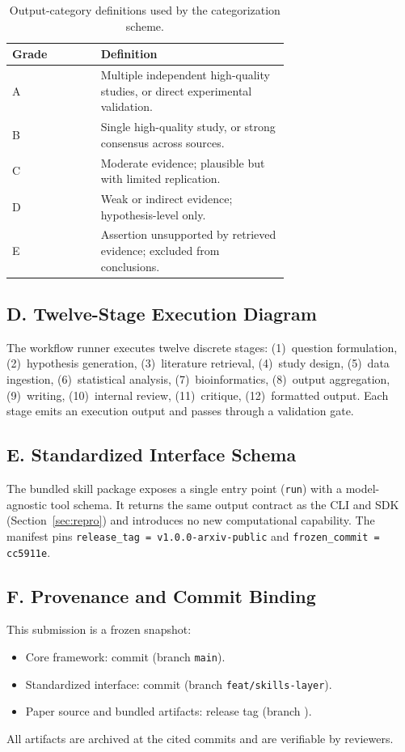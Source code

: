 \begin{table}[h]
\centering
\caption{Output-category definitions used by the categorization scheme.}
\label{tab:evidence}
\begin{tabular}{lp{0.68\linewidth}}
\toprule
Grade & Definition \\
\midrule
A & Multiple independent high-quality studies, or direct experimental validation. \\
B & Single high-quality study, or strong consensus across sources. \\
C & Moderate evidence; plausible but with limited replication. \\
D & Weak or indirect evidence; hypothesis-level only. \\
E & Assertion unsupported by retrieved evidence; excluded from conclusions. \\
\bottomrule
\end{tabular}
\end{table}

\subsection{D. Twelve-Stage Execution Diagram}
The workflow runner executes twelve discrete stages: (1)~question formulation,
(2)~hypothesis generation, (3)~literature retrieval, (4)~study design,
(5)~data ingestion, (6)~statistical analysis, (7)~bioinformatics,
(8)~output aggregation, (9)~writing, (10)~internal review, (11)~critique,
(12)~formatted output. Each stage emits an execution output and passes through a validation gate.

\subsection{E. Standardized Interface Schema}
The bundled skill package exposes a single entry point (\texttt{run}) with a
model-agnostic tool schema. It returns the same output contract as the CLI and SDK
(Section~\ref{sec:repro}) and introduces no new computational capability. The
manifest pins \texttt{release\_tag = v1.0.0-arxiv-public} and
\texttt{frozen\_commit = cc5911e}.

\subsection{F. Provenance and Commit Binding}
This submission is a frozen snapshot:
\begin{itemize}
\item Core framework: commit \texttt{\corecommit} (branch \texttt{main}).
\item Standardized interface: commit \texttt{\skillcommit} (branch \texttt{feat/skills-layer}).
\item Paper source and bundled artifacts: release tag \texttt{\releasetag}
      (branch \texttt{\papersub}).
\end{itemize}
All artifacts are archived at the cited commits and are verifiable by reviewers.
